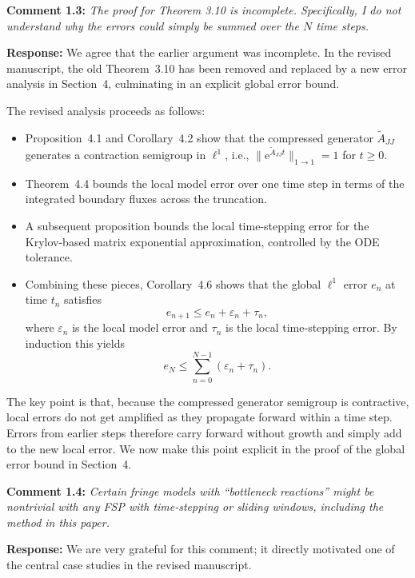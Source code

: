 \documentclass[11pt]{article}
\begin{document}
\medskip

\noindent\textbf{Comment 1.3:} \textit{The proof for Theorem 3.10 is incomplete. Specifically, I do not
understand why the errors could simply be summed over the $N$ time steps.}

\textbf{Response:} We agree that the earlier argument was incomplete. In the revised
manuscript, the old Theorem~3.10 has been removed and replaced by a new error
analysis in Section~4, culminating in an explicit global error bound.

The revised analysis proceeds as follows:

\begin{itemize}
  \item Proposition~4.1 and Corollary~4.2 show that the compressed generator
        $\widetilde{A}_{JJ}$ generates a contraction semigroup in $\ell^1$, i.e.,
        $\|\mathrm{e}^{\widetilde{A}_{JJ} t}\|_{1\to 1} = 1$ for $t\ge 0$.
  \item Theorem~4.4 bounds the local model error over one time step in terms of the
        integrated boundary fluxes across the truncation.
  \item A subsequent proposition bounds the local time-stepping error for the
        Krylov-based matrix exponential approximation, controlled by the ODE
        tolerance.
  \item Combining these pieces, Corollary~4.6 shows that the global $\ell^1$ error
        $e_n$ at time $t_n$ satisfies
        \[
          e_{n+1} \le e_n + \varepsilon_n + \tau_n,
        \]
        where $\varepsilon_n$ is the local model error and $\tau_n$ is the local
        time-stepping error. By induction this yields
        \[
          e_N \le \sum_{n=0}^{N-1} (\varepsilon_n + \tau_n).
        \]
\end{itemize}

The key point is that, because the compressed generator semigroup is contractive,
local errors do not get amplified as they propagate forward within a time step.
Errors from earlier steps therefore carry forward without growth and simply add to
the new local error. We now make this point explicit in the proof of the global
error bound in Section~4.

\medskip

\noindent\textbf{Comment 1.4:} \textit{Certain fringe models with ``bottleneck reactions'' might be
nontrivial with any FSP with time-stepping or sliding windows, including the
method in this paper.}

\textbf{Response:} We are very grateful for this comment; it directly motivated one of
the central case studies in the revised manuscript.
\end{document}
